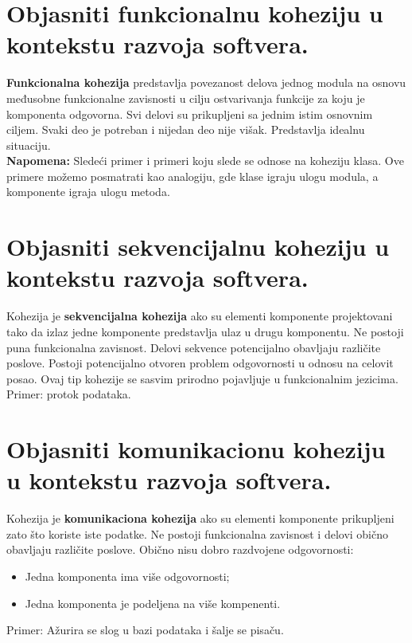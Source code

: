 \documentclass[a4paper]{article}
\begin{document}
\section{Objasniti funkcionalnu koheziju u kontekstu razvoja softvera.}
  \textbf{Funkcionalna kohezija} predstavlja povezanost delova jednog modula na osnovu 
  međusobne funkcionalne zavisnosti u cilju ostvarivanja funkcije za koju je komponenta
  odgovorna. Svi delovi su prikupljeni sa jednim istim osnovnim ciljem. Svaki deo je potreban i
  nijedan deo nije višak. Predstavlja idealnu situaciju. \\
  \textbf{Napomena:} Sledeći primer i primeri koju slede se odnose na koheziju klasa. Ove primere
  možemo posmatrati kao analogiju, gde klase igraju ulogu modula, a komponente igraja ulogu
  metoda.

\section{Objasniti sekvencijalnu koheziju u kontekstu razvoja softvera.}
  Kohezija je \textbf{sekvencijalna kohezija} ako su elementi komponente projektovani 
  tako da izlaz jedne komponente predstavlja ulaz u drugu komponentu. Ne postoji puna
  funkcionalna zavisnost. Delovi sekvence potencijalno obavljaju različite poslove. Postoji
  potencijalno otvoren problem odgovornosti u odnosu na celovit posao. Ovaj tip kohezije
  se sasvim prirodno pojavljuje u funkcionalnim jezicima. Primer: protok podataka.
  
\section{Objasniti komunikacionu koheziju u kontekstu razvoja softvera.}
  Kohezija je \textbf{komunikaciona kohezija} ako su elementi komponente prikupljeni 
  zato što koriste iste podatke. Ne postoji funkcionalna zavisnost i delovi obično obavljaju
  različite poslove. Obično nisu dobro razdvojene odgovornosti: 
  \begin{itemize}
    \item Jedna komponenta ima više odgovornosti;
    \item Jedna komponenta je podeljena na više kompenenti.
  \end{itemize}
  Primer: Ažurira se slog u bazi podataka i šalje se pisaču.
\end{document}
